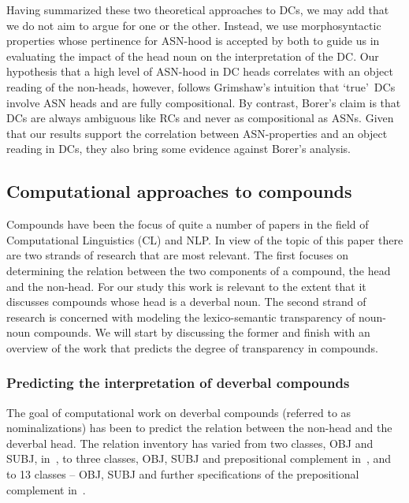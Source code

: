 \documentclass[output=paper]{langsci/langscibook}
\begin{document}
Having summarized these two  theoretical approaches to DCs, we may add that we do not aim to argue for one or the other. Instead, we use morphosyntactic properties whose pertinence for ASN-hood is accepted by both to guide us in evaluating the impact of the head noun on the interpretation of the DC. Our hypothesis that a high level of ASN-hood in DC heads correlates with an object reading of the non-heads, however, follows Grimshaw's intuition that \lq true\rq\  DCs involve ASN heads and are fully compositional. By contrast, Borer's claim is that DCs are always ambiguous like RCs and never as compositional as ASNs.
 {Given that our results support the correlation between ASN-properties and an object reading in DCs, they also bring some evidence against Borer's analysis.}

\subsection{Computational approaches to compounds}\label{sec:NLP:lit}
Compounds have been the focus of quite a number of papers in the field of Computational Linguistics (CL) and NLP. In view of the topic of this paper there are two strands of research that are most relevant. The first  focuses on determining the relation between the two components of a compound, the head and the non-head. 
For our study this work is relevant to the extent that it discusses compounds whose head is a deverbal noun.  
The second strand of research is concerned with modeling the  {lexico-semantic transparency} of noun-noun compounds. We will start by discussing the former and finish with an overview of the work that predicts the degree of  {transparency} in compounds.

\subsubsection{Predicting the interpretation of  {deverbal} compounds}\label{sec:NLP:lit:predictions}
The goal of computational work on deverbal compounds (referred to as nominalizations) has been to predict the relation between the non-head and the deverbal head. The relation inventory  
has varied from two classes, OBJ and SUBJ, in~\cite{lapata:02}, to three classes, OBJ, SUBJ and prepositional complement in~\cite{NicholsonBaldwin:06}, and to 13 classes -- OBJ, SUBJ and further specifications of the prepositional complement in~\cite{grover:lapata:lascarides:05}. 
\end{document}
